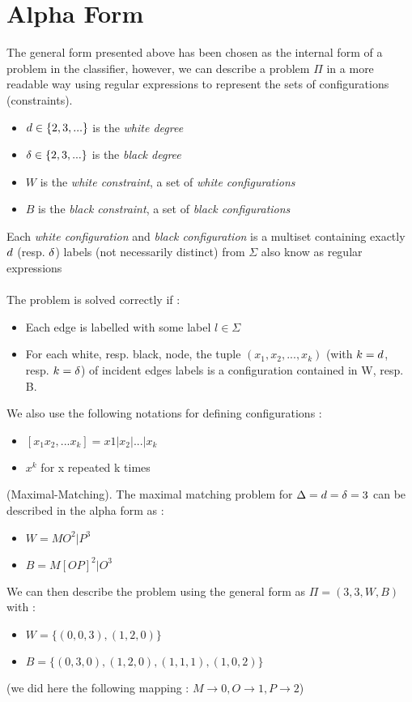 \section{Alpha Form}\label{section:alpha}
The general form presented above has been chosen as the internal form of a problem in the classifier, however, we can describe a problem $\Pi$ in a more readable way using regular expressions \cite{1,LB_MM} to represent the sets of configurations (constraints).
\begin{itemize}
    \item $d\in\{2,3,...\}$ is the \textit{white degree}
    \item $\delta\in\{2,3,...\}$ is the \textit{black degree}
    \item $W$ is the \textit{white constraint}, a set of \textit{white configurations}
    \item $B$ is the \textit{black constraint}, a set of \textit{black configurations}
\end{itemize}
Each \textit{white configuration}  and \textit{black configuration} is a multiset containing exactly $d$ (resp. $\delta$) labels (not necessarily distinct) from $\Sigma$ also know as regular expressions\\\\
The problem is solved correctly if :
\begin{itemize}
    \item Each edge is labelled with some label $l\in\Sigma$
    \item For each white, resp. black, node, the tuple $(x_1,x_2, ..., x_k)$ (with $k=d$, resp. $k=\delta$) of incident edges labels is a configuration contained in W, resp. B.
\end{itemize}
We also use the following notations for defining configurations :
\begin{itemize}
    \item $[x_1x_2,...x_k] = x1|x_2|...|x_k$
    \item $x^k$ for x repeated k times
\end{itemize}
\begin{exmp}
(Maximal-Matching). The maximal matching problem for $\Delta = d = \delta = 3$ can be described in the alpha form as :
\begin{itemize}
    \item $W = MO^{2}|P^{3}$
    \item $B = M[OP]^{2}|O^{3}$
\end{itemize}
We can then describe the problem using the general form as
$\Pi = (3,3,W,B)$ with :
\begin{itemize}
    \item $W = \{(0,0,3),(1, 2, 0)\}$
    \item $B = \{(0,3,0),(1,2,0),(1,1,1),(1,0,2)\}$
\end{itemize}
(we did here the following mapping : $M\rightarrow 0, O\rightarrow 1, P\rightarrow 2$)
\end{exmp}
